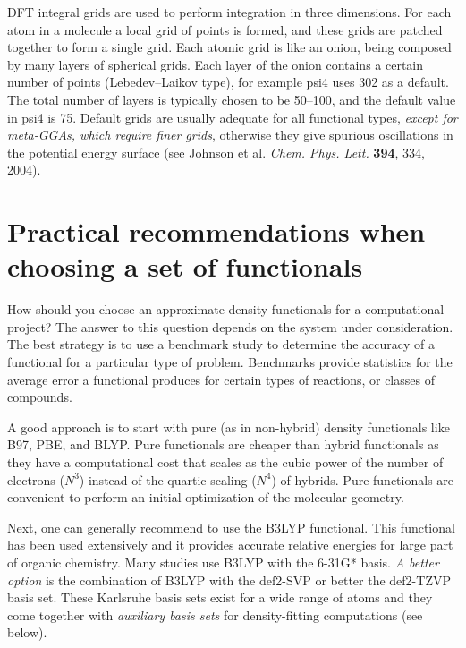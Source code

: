 \documentclass[../Main/chem371-notes.tex]{subfiles}
\begin{document}
DFT integral grids are used to perform integration in three dimensions.
For each atom in a molecule a local grid of points is formed, and these grids are patched together to form a single grid.
Each atomic grid is like an onion, being composed by many layers of spherical grids.
Each layer of the onion contains a certain number of points (Lebedev--Laikov type), for example psi4 uses 302 as a default.
The total number of layers is typically chosen to be 50--100, and the default value in psi4 is 75.
Default grids are usually adequate for all functional types, \emph{except for meta-GGAs, which require finer grids}, otherwise they give spurious oscillations in the potential energy surface (see Johnson et al. \textit{Chem. Phys. Lett.} \textbf{394}, 334, 2004).



\section{Practical recommendations when choosing a set of functionals}

How should you choose an approximate density functionals for a computational project?
The answer to this question depends on the system under consideration.
The best strategy is to use a benchmark study to determine the accuracy of a functional for a particular type of problem.
Benchmarks provide statistics for the average error a functional produces for certain types of reactions, or classes of compounds.

A good approach is to start with pure (as in non-hybrid) density functionals like B97, PBE, and BLYP.
Pure functionals are cheaper than hybrid functionals as they have a computational cost that scales as the cubic power of the number of electrons ($N^3$) instead of the quartic scaling ($N^4$) of hybrids.
Pure functionals are convenient to perform an initial optimization of the molecular geometry.

Next, one can generally recommend to use the B3LYP functional. This functional has been used extensively and it provides accurate relative energies for large part of organic chemistry. 
Many studies use B3LYP with the 6-31G* basis. \emph{A better option} is the combination of B3LYP with the def2-SVP or better the def2-TZVP basis set.
These Karlsruhe basis sets exist for a wide range of atoms and they come together with \emph{auxiliary basis sets} for density-fitting computations (see below).
\end{document}
